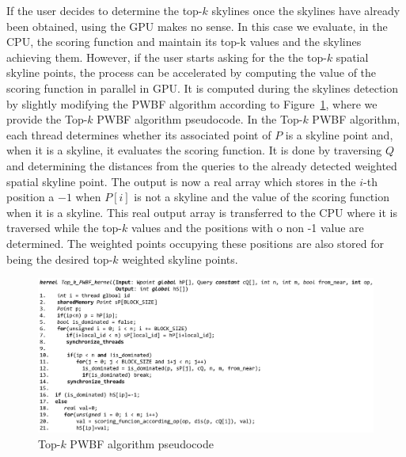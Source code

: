 \documentclass[11pt,onecolumn]{elsart3p}
\begin{document}
        If the user decides to determine the top-$k$ skylines once the skylines have already been obtained, using the GPU makes no sense. In this case we evaluate, in the CPU, the scoring function and maintain its top-k values and the skylines achieving them. However, if the user starts asking for the the top-$k$ spatial skyline points, the process can be accelerated by computing the value of the scoring function in parallel in GPU. It is computed during the skylines detection by slightly modifying the PWBF algorithm according to Figure~\ref{fig:alg_paral_topk}, where we provide the Top-$k$ PWBF algorithm pseudocode. In the Top-$k$ PWBF algorithm, each thread determines whether its associated point of $P$ is a skyline point and, when it is a skyline, it evaluates the scoring function. It is done by traversing $Q$ and determining the distances from the queries to the already detected weighted spatial skyline point. The output is now a real array  which stores in the $i$-th position a $-1$ when $P[i]$ is not a skyline and the value of the scoring function when it is a skyline. This real output array is transferred to the CPU where it is traversed while the top-$k$ values and the positions with o non -1 value are determined. The weighted points occupying these positions are also stored for being the desired top-$k$ weighted skyline points.

        \begin{figure}[]
        \begin{center}
        \includegraphics[width=\linewidth]{img/algorithm_PA_tk.eps}
        \caption{Top-$k$ PWBF algorithm pseudocode}\label{fig:alg_paral_topk}
        \end{center}
        \end{figure}
\vspace{1.5em}
\end{document}

